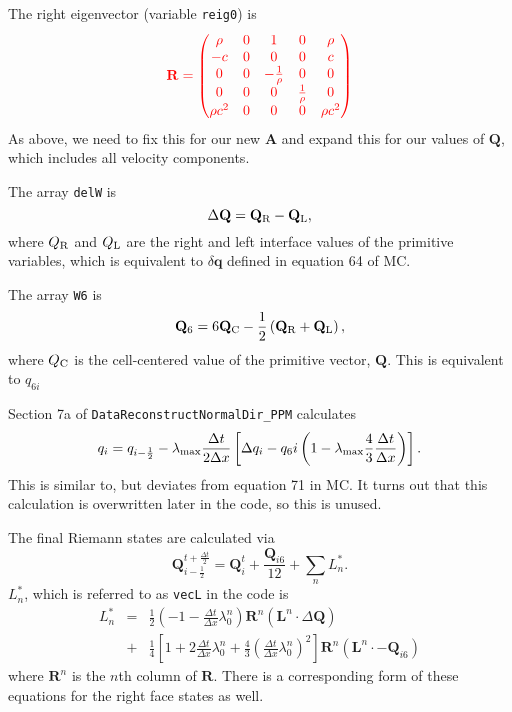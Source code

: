 \documentclass[preprint,11pt]{aastex}
\newcommand{\beq}{\begin{equation}}
\newcommand{\eeq}{\end{equation}}
\newcommand{\bea}{\begin{eqnarray}}
\newcommand{\eea}{\end{eqnarray}}
\begin{document}
The right eigenvector (variable \verb!reig0!) is
\beq
{\color{red}
\mathbf{R} = 
\begin{pmatrix}
\rho & 0 & 1 & 0 & \rho \\
-c & 0 & 0 & 0 & c \\
0 & 0 & -\frac{1}{\rho} & 0 & 0 \\
0 & 0 & 0 & \frac{1}{\rho} & 0 \\
\rho c^2 & 0 & 0 & 0 & \rho c^2
\end{pmatrix}
}
\eeq
{\color{blue} As above, we need to fix this for our new $\mathbf{A}$ and  expand this for our values of $\mathbf{Q}$, which includes all velocity components}.

The array \verb!delW! is
\beq
\Delta \mathbf{Q} = \mathbf{Q}_{\rm R} - \mathbf{Q}_{\rm L},
\eeq
where $Q_{\rm R}$ and $Q_{\rm L}$ are the right and left interface values of the primitive variables, which is equivalent to $\delta \mathbf{q}$ defined in equation 64 of MC.

The array \verb!W6! is
\beq
\mathbf{Q}_6 = 6 \mathbf{Q}_{\rm C} - \frac{1}{2} \left( \mathbf{Q}_{\rm R} + \mathbf{Q}_{\rm L} \right),
\eeq
where $Q_{\rm C}$ is the cell-centered value of the primitive vector, $\mathbf{Q}$.  This is equivalent to $q_{6i}$

Section 7a of \verb!DataReconstructNormalDir_PPM! calculates
\beq
q_i = q_{i-\frac{1}{2}} - \lambda_{\rm max} \frac{\Delta t}{2 \Delta x} \left[ \Delta q_i - q_6i \left( 1 - \lambda_{\rm max} \frac{4}{3} \frac{\Delta t}{\Delta x}  \right) \right].
\eeq
This is similar to, but deviates from equation 71 in MC.  It turns out that this calculation is overwritten later in the code, so this is unused.

The final Riemann states are calculated via 
\beq
\label{rstates}
\mathbf{Q}_{i-\frac{1}{2}}^{t+\frac{\Delta t}{2}} = \mathbf{Q}_{i}^{t} + \frac{\mathbf{Q}_{i6}}{12} + \sum\limits_n L^*_n.
\eeq
$L^*_n$, which is referred to as \verb!vecL! in the code is
\bea
L^*_n &=& \frac{1}{2} \left( -1 - \frac{\Delta t}{\Delta x} \lambda_{0}^n \right) \mathbf{R}^n \left( \mathbf{L}^n \cdot \Delta \mathbf{Q} \right) \nonumber \\
&+& \frac{1}{4} \left[ 1 + 2 \frac{\Delta t}{\Delta x} \lambda_{0}^n  + \frac{4}{3} \left( \frac{\Delta t}{\Delta x} \lambda_0^n \right)^2 \right] \mathbf{R}^n \left( \mathbf{L}^n \cdot - \mathbf{Q}_{i6} \right)
\eea
where $\mathbf{R}^n$ is the $n$th column of $\mathbf{R}$.  There is a corresponding form of these equations for the right face states as well.
\end{document}
